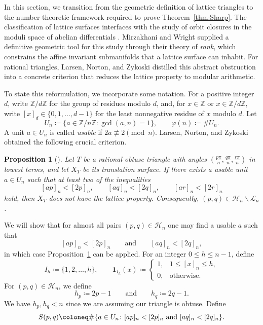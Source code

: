 \documentclass[12pt]{amsart}
\newtheorem{proposition}[theorem]{Proposition}
\theoremstyle{definition}
\newcommand{\Z}{\mathbb{Z}}
\begin{document}
In this section, we transition from the geometric definition of lattice triangles to the number-theoretic framework required to prove Theorem~\ref{thm:Sharp}.  The classification of lattice surfaces interfaces with the study of orbit closures in the moduli space of abelian differentials \cite{E, EMM, MW}.  Mirzakhani and Wright supplied a definitive geometric tool for this study through their theory of \emph{rank}, which constrains the affine invariant submanifolds that a lattice surface can inhabit.  For rational triangles, Larsen, Norton, and Zykoski \cite{LNZ} distilled this abstract obstruction into a concrete criterion that reduces the lattice property to modular arithmetic.

To state this reformulation, we {incorporate} some notation.  For a positive integer $d$, write $\Z/d\Z$ for the group of residues modulo $d$, and, for $x\in\Z$ or $x\in\Z/d\Z$, write $[x]_d\in\{0,1,\ldots,d-1\}$ for the least nonnegative residue of $x$ modulo $d$.  Let
\[
U_n \coloneq \{a\in\Z/n\Z\colon\gcd(a,n)=1\},\qquad \varphi(n)\coloneq \# U_n.
\]
A unit $a\in U_n$ is called \emph{usable} if $2a\not\equiv 2\pmod n$.  Larsen, Norton, and Zykoski \cite{LNZ} obtained the following crucial criterion.

\begin{proposition}[{\cite[Proposition 2.1]{LNZ}}]
\label{prop:LNZ}
Let $T$ be a rational obtuse triangle with angles $(\frac{p\pi}{n},\frac{q\pi}{n},\frac{r\pi}{n})$ in lowest terms, and let ${X_T}$ be its translation surface.  If there exists a usable unit $a\in U_n$ such that at least two of the {inequalities}
\[
[ap]_n<[2p]_n,\qquad [aq]_n<[2q]_n,\qquad [ar]_n<[2r]_n
\]
{hold, t}hen ${X_T}$ does not have the lattice property. Consequently, $(p,q)\in\mathcal{H}_n\smallsetminus\mathcal{L}_n$.
\end{proposition}

We will show that for almost all pairs $(p,q)\in\mathcal{H}_n$ one may find a usable $a$ such that
\[
[ap]_n<[2p]_n\qquad \text{and}\qquad [aq]_n<[2q]_n,
\]
in which case Proposition~\ref{prop:LNZ} can be applied. For an integer $0\le h\le n-1$, define
\[
I_{h} \coloneq \{1,2,\dots,h\},\qquad   \mathbf{1}_{I_{h}}(x) \coloneq
  \begin{cases}
    1,& 1\le [x]_n\le h,\\
    0,& \text{otherwise.}
  \end{cases}
\]
For $(p,q)\in\mathcal{H}_n$, we define
\[
h_p \coloneq 2p-1\qquad \text{and} \qquad h_q \coloneq 2q-1.
\]
We have $h_p,h_q < n$ since we are assuming our triangle is obtuse. Define
\[
S(p,q) \coloneq \#\{a\in U_n\colon \textup{$[ap]_n<[2p]_n$ and $[aq]_n<[2q]_n$}\}.
\]
\end{document}
